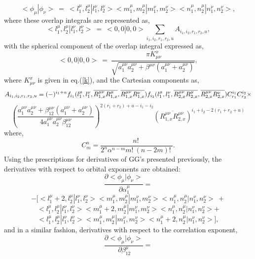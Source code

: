 \begin{equation}
<\phi _\mu |\phi _\nu >\ =\ <l_1^\mu ,l_2^\mu |l_1^\nu ,l_2^\nu ><m_1^\mu
,m_2^\mu |m_1^\nu ,m_2^\nu ><n_1^\mu ,n_2^\mu |n_1^\nu ,n_2^\nu >,
\end{equation}
where these overlap integrals are represented as, 
\begin{equation}
<l_1^\mu ,l_2^\mu |l_1^\nu ,l_2^\nu >\ =\
<0,0|0,0>\sum_{i_1,i_2,r_1,r_2,u}A_{i_1,i_2,r_1,r_2,u},
\end{equation}
with the spherical component of the overlap integral expressed as, 
\begin{equation}
<0,0|0,0>\ =\ {\frac{{\ \pi K_{\mu \nu }^x}}{\sqrt{a_1^{\mu \nu }a_2^{\mu
\nu }+\beta ^{\mu \nu }(a_1^{\mu \nu }+a_2^{\mu \nu })}},}  \label{detab}
\end{equation}
where ${K_{\mu \nu }^x}$ is given in eq.(\ref{k}), and the Cartesian
components as, 
\[
A_{i_1,i_2,r_1,r_2,u}=(-)^{i_1+u}f_{i_1}(l_1^\mu ,l_1^\nu ,\overline{%
R_{1,x}^{\mu \nu }R_{1,x}^\mu },\overline{R_{1,x}^{\mu \nu }R_{1,x}^\nu }%
)f_{i_2}(l_1^\mu ,l_1^\nu ,\overline{R_{2,x}^{\mu \nu }R_{2,x}^\mu },%
\overline{R_{2,x}^{\mu \nu }R_{2,x}^\nu })C_{r_1}^{i_1}C_{r_2}^{i_2}\times 
\]
\begin{equation}
\left( {\frac{a_1^{\mu \nu }a_2^{\mu \nu }+\beta _{12}^{\mu \nu }(a_1^{\mu
\nu }+a_2^{\mu \nu })}{4a_1^{\mu \nu }a_2^{\mu \nu }\beta _{12}^{\mu \nu }}}%
\right) ^{2(r_1+r_2)+u-i_1-i_2}(\overline{R_{1,x}^{\mu \nu }R_{2,x}^{\mu \nu
}})^{i_1+i_2-2(r_1+r_2+u)}
\end{equation}
where, 
\begin{equation}
C_m^n={\frac{n!\ }{2^n\alpha ^{n-m}m!\ (n-2m)!\ }}.
\end{equation}
Using the prescriptions for derivatives of GG's presented previously, the
derivatives with respect to orbital exponents are obtained: 
\[
{\frac{{\partial <\phi _\mu |\phi _\nu >}}{{\ \partial \alpha _1^\mu }}}=
\]
\[
-[<l_1^\mu +2,l_2^\mu |l_1^\nu ,l_2^\nu ><m_1^\mu ,m_2^\mu |m_1^\nu ,m_2^\nu
><n_1^\mu ,n_2^\mu |n_1^\nu ,n_2^\nu >\ +
\]
\[
<l_1^\mu ,l_2^\mu |l_1^\nu ,l_2^\nu ><m_1^\mu +2,m_2^\mu |m_1^\nu ,m_2^\nu
><n_1^\mu ,n_2^\mu |n_1^\nu ,n_2^\nu >+
\]
\begin{equation}
<l_1^\mu ,l_2^\mu |l_1^\nu ,l_2^\nu ><m_1^\mu ,m_2^\mu |m_1^\nu ,m_2^\nu
><n_1^\mu +2,n_2^\mu |n_1^\nu ,n_2^\nu >],
\end{equation}
and in a similar fashion, derivatives with respect to the correlation
exponent, 
\[
{\frac{{\partial <\phi _\mu |\phi _\nu >}}{{\ \partial \beta _{12}^\mu }}}=
\]
